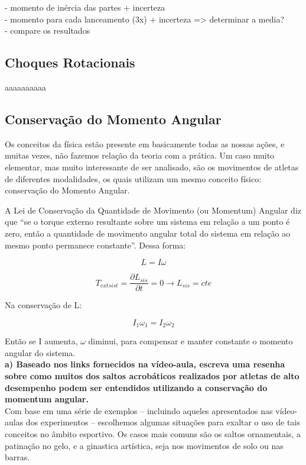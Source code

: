 - momento de inércia das partes + incerteza\\
- momento para cada lanceamento (3x) + incerteza => determinar a media?\\
- compare os resultados


\subsection{Choques Rotacionais}

aaaaaaaaaa




\subsection{Conservação do Momento Angular}

Os conceitos da física estão presente em basicamente todas as nossas ações, e muitas vezes, não fazemos relação da teoria com a prática. Um caso muito elementar, mas muito interessante de ser analisado, são os movimentos de atletas de diferentes modalidades, os quais utilizam um mesmo conceito físico:  conservação do Momento Angular.

A Lei de Conservação da Quantidade de Movimento (ou Momentum) Angular diz que “se o torque externo resultante sobre um sistema em relação a um ponto é zero, então a quantidade de movimento angular total do sistema em relação ao mesmo ponto permanece constante”. Dessa forma: 

\[L = I  \omega\]

\[T_{ext sist} = \frac{\partial L_{sis}}{\partial t} = 0 \xrightarrow{} L_{sis} = cte\]

Na conservação de L: 

\[I_1 \omega _1 = I_2 \omega _2 \]

Então se I aumenta, $\omega$ diminui, para compensar e manter constante o momento angular do sistema.\\
 
\textbf{a) Baseado nos links fornecidos na vídeo-aula, escreva uma resenha sobre como muitos dos saltos acrobáticos realizados por atletas de alto desempenho podem ser entendidos utilizando a conservação do momentum angular.}\\

Com base em uma série de exemplos – incluindo aqueles apresentados nas vídeo-aulas dos experimentos – escolhemos algumas situações para exaltar o uso de tais conceitos no âmbito esportivo. Os casos mais comuns são os saltos ornamentais, a patinação no gelo, e a ginastica artística, seja nos movimentos de solo ou nas barras.\\

